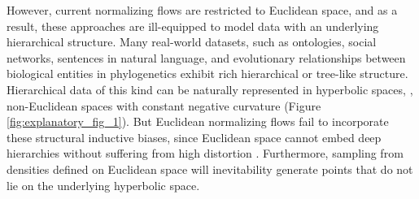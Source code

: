 However, current normalizing flows are restricted to Euclidean space, and as a result, these approaches are ill-equipped to model data with an underlying hierarchical structure. %
Many real-world datasets, such as ontologies, social networks, sentences in natural language, and evolutionary relationships between biological entities in phylogenetics exhibit rich hierarchical or tree-like structure.
Hierarchical data of this kind can be naturally represented in hyperbolic spaces, \ie, non-Euclidean spaces with constant negative curvature (Figure \ref{fig:explanatory_fig_1}). 
But Euclidean normalizing flows fail to incorporate these structural inductive biases, since Euclidean space cannot embed deep hierarchies without suffering from high distortion \cite{sarkar2011low}. Furthermore, sampling from densities defined on Euclidean space will inevitability generate points that do not lie on the underlying hyperbolic space. 



